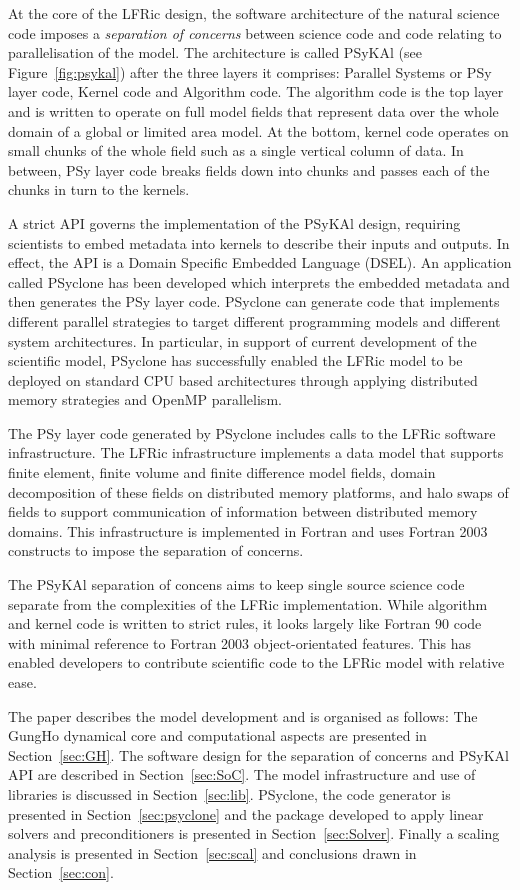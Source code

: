 \documentclass[review,times]{elsarticle}
\begin{document}
At the core of the LFRic design, the software architecture of the
natural science code imposes a {\em separation of concerns} between
science code and code relating to parallelisation of the model. The
architecture is called PSyKAl (see Figure~\ref{fig:psykal}) after the
three layers it comprises: Parallel Systems or PSy layer code, Kernel
code and Algorithm code. The algorithm code is the top layer and is
written to operate on full model fields that represent data over the
whole domain of a global or limited area model. At the bottom, kernel
code operates on small chunks of the whole field such as a single
vertical column of data. In between, PSy layer code breaks fields down
into chunks and passes each of the chunks in turn to the kernels.

A strict API governs the implementation of the PSyKAl design,
requiring scientists to embed metadata into kernels to describe their
inputs and outputs. In effect, the API is a Domain Specific Embedded
Language (DSEL). An application called PSyclone has been developed
which interprets the embedded metadata and then generates the PSy
layer code. PSyclone can generate code that implements different
parallel strategies to target different programming models and
different system architectures. In particular, in support of current
development of the scientific model, PSyclone has successfully enabled
the LFRic model to be deployed on standard CPU based architectures through
applying distributed memory strategies and OpenMP parallelism.

The PSy layer code generated by PSyclone includes calls to the LFRic
software infrastructure. The LFRic infrastructure implements a data
model that supports finite element, finite volume and finite
difference model fields, domain decomposition of these fields on
distributed memory platforms, and halo swaps of fields to support
communication of information between distributed memory domains. This
infrastructure is implemented in Fortran and uses Fortran 2003
constructs to impose the separation of concerns.

The PSyKAl separation of concens aims to keep single source science
code separate from the complexities of the LFRic implementation. While
algorithm and kernel code is written to strict rules, it looks largely
like Fortran 90 code with minimal reference to Fortran 2003
object-orientated features. This has enabled developers to contribute
scientific code to the LFRic model with relative ease.

The paper describes the model development and is organised as follows:
The GungHo dynamical core and computational aspects are presented in
Section~\ref{sec:GH}. The software design for the separation of
concerns and PSyKAl API are described in
Section~\ref{sec:SoC}. The model infrastructure and use of libraries
is discussed in Section~\ref{sec:lib}. PSyclone, the code generator is
presented in Section~\ref{sec:psyclone} and the package developed to
apply linear solvers and preconditioners is presented in Section~\ref{sec:Solver}.
Finally a scaling analysis is presented in Section~\ref{sec:scal} and
conclusions drawn in Section~\ref{sec:con}.
\end{document}
